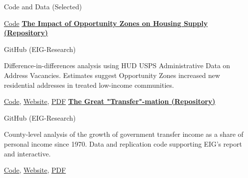 \begin{rubric}{Code and Data (Selected)}
    \par \href{https://github.com/EIG-Research/EIG-Savers-match-sipp}{Code}
\entry*[2025]%
    \textbf{\href{https://github.com/EIG-Research/oz-housing-supply}{The Impact of Opportunity Zones on Housing Supply (Repository)}}
    \par GitHub (EIG-Research)
    \par Difference-in-differences analysis using HUD USPS Administrative Data on Address Vacancies. Estimates suggest Opportunity Zones increased new residential addresses in treated low-income communities.
    \par \href{https://github.com/EIG-Research/oz-housing-supply}{Code}, \href{https://eig.org/opportunity-zones-housing-supply/}{Website}, \href{https://eig.org/wp-content/uploads/2025/02/The_Impact_of_Opportunity_Zones_on_Housing_Supply.pdf}{PDF}
\entry*[2024]%
    \textbf{\href{https://github.com/EIG-Research/EIG-Great-Transfer-Mation}{The Great "Transfer"-mation (Repository)}}
    \par GitHub (EIG-Research)
    \par County-level analysis of the growth of government transfer income as a share of personal income since 1970. Data and replication code supporting EIG's report and interactive.
    \par \href{https://github.com/EIG-Research/EIG-Great-Transfer-Mation}{Code}, \href{https://eig.org/great-transfermation/}{Website}, \href{https://eig.org/wp-content/uploads/2024/09/Great-Transfermation.pdf}{PDF}
\end{rubric}

